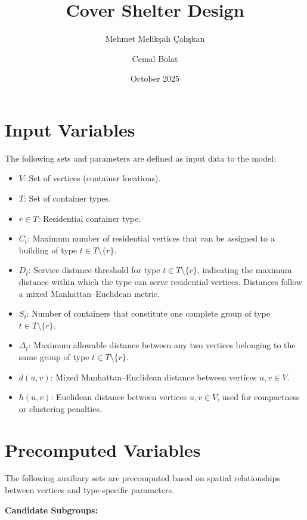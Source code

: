 \documentclass[12pt,a4paper]{article}
\title{Cover Shelter Design}
\author{Mehmet Melikşah Çalışkan \and Cemal Bolat}
\date{October 2025}
\begin{document}
\maketitle

\section{Input Variables}

The following sets and parameters are defined as input data to the model:

\begin{itemize}
    \item $V$: Set of vertices (container locations).
    \item $T$: Set of container types.
    \item $r \in T$: Residential container type.
    \item $C_t$: Maximum number of residential vertices that can be assigned to a building of type $t \in T \setminus \{r\}$.
    \item $D_t$: Service distance threshold for type $t \in T \setminus \{r\}$, indicating the maximum distance within which the type can serve residential vertices. Distances follow a mixed Manhattan–Euclidean metric.
    \item $S_t$: Number of containers that constitute one complete group of type $t \in T \setminus \{r\}$.
    \item $\Delta_t$: Maximum allowable distance between any two vertices belonging to the same group of type $t \in T \setminus \{r\}$.
    \item $d(u,v)$: Mixed Manhattan–Euclidean distance between vertices $u,v \in V$.
    \item $h(u,v)$: Euclidean distance between vertices $u,v \in V$, used for compactness or clustering penalties.
\end{itemize}

\newpage

\section{Precomputed Variables}

The following auxiliary sets are precomputed based on spatial relationships between vertices and type-specific parameters.

\vspace{1em}

\textbf{Candidate Subgroups:}
\end{document}
